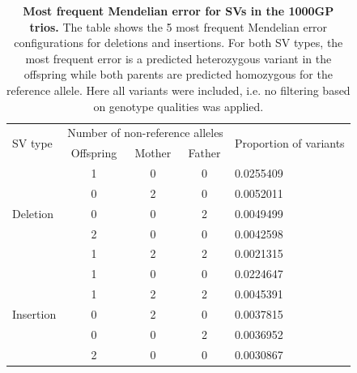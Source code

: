 \documentclass[11pt]{ucscthesis}
\begin{document}
\begin{table}[p]
  \centering
  \begin{tabular}[t]{|l|c|c|c|l|}
    \hline
    \multirow{2}{*}{SV type} & \multicolumn{3}{|l|}{Number of non-reference alleles} & \multirow{2}{*}{Proportion of variants} \\
                             & Offspring                                             & Mother & Father &                       \\
    \hline
    \multirow{5}{*}{Deletion}     & 1                                                     & 0      & 0      & 0.0255409             \\
                             & 0                                                     & 2      & 0      & 0.0052011             \\
                             & 0                                                     & 0      & 2      & 0.0049499             \\
                             & 2                                                     & 0      & 0      & 0.0042598             \\
                             & 1                                                     & 2      & 2      & 0.0021315             \\
    \hline
    \multirow{5}{*}{Insertion}     & 1                                                     & 0      & 0      & 0.0224647             \\
                             & 1                                                     & 2      & 2      & 0.0045391             \\
                             & 0                                                     & 2      & 0      & 0.0037815             \\
                             & 0                                                     & 0      & 2      & 0.0036952             \\
                             & 2                                                     & 0      & 0      & 0.0030867             \\
    \hline
  \end{tabular}
  \caption[Most frequent Mendelian errors for SVs in the 1000GP trios]{{\bf Most frequent Mendelian error for SVs in the 1000GP trios.}
    The table shows the 5 most frequent Mendelian error configurations for deletions and insertions.
    For both SV types, the most frequent error is a predicted heterozygous variant in the offspring while both parents are predicted homozygous for the reference allele.
    Here all variants were included, i.e. no filtering based on genotype qualities was applied.
  }
  \label{tab:sv-mend-error}
\end{table}
\end{document}
